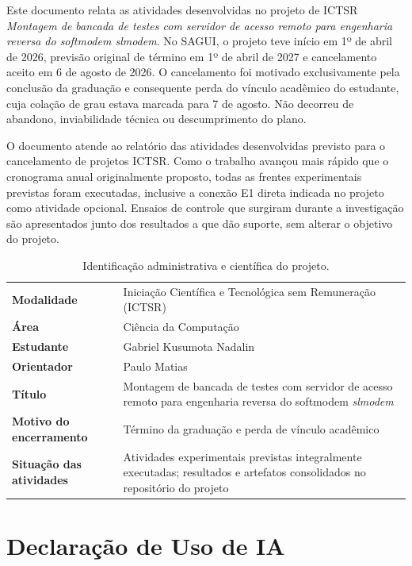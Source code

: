 \documentclass[12pt,a4paper]{article}
\newcommand{\slmodem}{\textit{slmodem}}
\begin{document}
Este documento relata as atividades desenvolvidas no projeto de ICTSR
\emph{Montagem de bancada de testes com servidor de acesso remoto para engenharia
reversa do softmodem slmodem}. No SAGUI, o projeto teve início em 1º de abril de
2026, previsão original de término em 1º de abril de 2027 e cancelamento aceito
em 6 de agosto de 2026. O cancelamento foi motivado exclusivamente pela conclusão
da graduação e consequente perda do vínculo acadêmico do estudante, cuja colação
de grau estava marcada para 7 de agosto. Não decorreu de abandono, inviabilidade
técnica ou descumprimento do plano.

O documento atende ao relatório das atividades desenvolvidas previsto para o
cancelamento de projetos ICTSR. Como o trabalho avançou mais rápido
que o cronograma anual originalmente proposto, todas as frentes experimentais
previstas foram executadas, inclusive a conexão E1 direta indicada no projeto como
atividade opcional. Ensaios de controle que surgiram durante a investigação são
apresentados junto dos resultados a que dão suporte, sem alterar o objetivo do
projeto.

\begin{table}[H]
\centering
\caption{Identificação administrativa e científica do projeto.}
\label{tab:identificacao}
\begin{tabularx}{\textwidth}{>{\bfseries}p{}Y}
\toprule
Modalidade & Iniciação Científica e Tecnológica sem Remuneração (ICTSR) \\
Área & Ciência da Computação \\
Estudante & Gabriel Kusumota Nadalin \\
Orientador & Paulo Matias \\
Título & Montagem de bancada de testes com servidor de acesso remoto para engenharia reversa do softmodem \slmodem \\
Motivo do encerramento & Término da graduação e perda de vínculo acadêmico \\
Situação das atividades & Atividades experimentais previstas integralmente executadas; resultados e artefatos consolidados no repositório do projeto \\
\bottomrule
\end{tabularx}
\end{table}

\clearpage
\section*{Declaração de Uso de IA}
\end{document}
